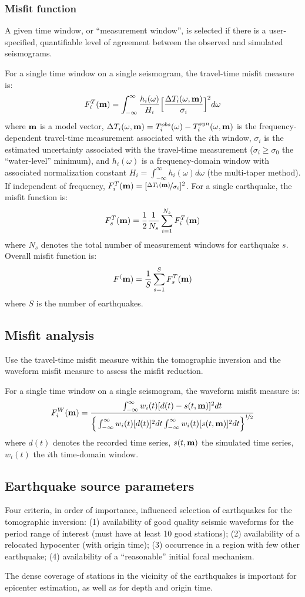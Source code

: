 \subsubsection{Misfit function}
A given time window, or ``measurement window'', is selected if there is a user-specified,
quantifiable level of agreement between the observed and simulated seismograms.

For a single time window on a single seismogram, the travel-time misfit measure is:
\[ F_i^T(\mathbf{m})=\int_{-\infty}^\infty \frac{h_i(\omega)}{H_i}\Big[\frac{\Delta T_i(\omega,\mathbf{m})}{\sigma_i}\Big]^2d\omega \]
where $\mathbf{m}$ is a model vector,
$\Delta T_i(\omega,\mathbf{m})=T_i^{obs}(\omega)-T_i^{syn}(\omega,\mathbf{m})$
is the frequency-dependent travel-time measurement associated with the $i$th window,
$\sigma_i$ is the estimated uncertainty associated with the travel-time measurement
($\sigma_i\geqslant\sigma_0$ the ``water-level'' minimum),
and $h_i(\omega)$ is a frequency-domain window
with associated normalization constant $H_i=\int_{-\infty}^\infty h_i(\omega)d\omega$
(the multi-taper method).
If independent of frequency, $F_i^T(\mathbf{m})=[\nicefrac{\Delta T_i(\mathbf{m})}{\sigma_i}]^2$.
For a single earthquake, the misfit function is:
\[ F_s^T(\mathbf{m})=\frac{1}{2}\frac{1}{N_s}\sum_{i=1}^{N_s}F_i^T(\mathbf{m}) \]
where $N_s$ denotes the total number of measurement windows for earthquake $s$.
Overall misfit function is:
\[ F^(\mathbf{m})=\frac{1}{S}\sum_{s=1}^SF_s^T(\mathbf{m}) \]
where $S$ is the number of earthquakes.

\subsection{Misfit analysis}
Use the travel-time misfit measure within the tomographic inversion
and the waveform misfit measure to assess the misfit reduction.

For a single time window on a single seismogram, the waveform misfit measure is:
\[ F_i^W(\mathbf{m})=\frac{\int_{-\infty}^\infty w_i(t)[d(t)-s(t,\mathbf{m})]^2dt}{\Big\{\int_{-\infty}^\infty w_i(t)[d(t)]^2dt\int_{-\infty}^\infty w_i(t)[s(t,\mathbf{m})]^2dt\Big\}^{\nicefrac{1}{2}}} \]
where $d(t)$ denotes the recorded time series, $s(t,\mathbf{m})$ the simulated time series,
$w_i(t)$ the $i$th time-domain window.

\subsection{Earthquake source parameters}
Four criteria, in order of importance,
influenced selection of earthquakes for the tomographic inversion:
(1) availability of good quality seismic waveforms for the period range of interest
(must have at least 10 good stations);
(2) availability of a relocated hypocenter (with origin time);
(3) occurrence in a region with few other earthquake;
(4) availability of a ``reasonable'' initial focal mechanism.

The dense coverage of stations in the vicinity of the earthquakes is important
for epicenter estimation, as well as for depth and origin time.

